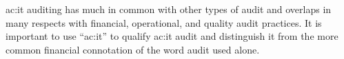 
\gls{ac:it} auditing has much in common with other types of audit and overlaps in many respects with financial, operational, and quality audit practices. It is important to use “\gls{ac:it}” to qualify \gls{ac:it} audit and distinguish it from the more common financial connotation of the word audit used alone. 






